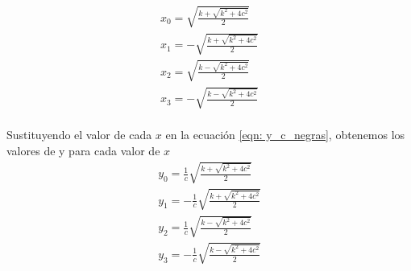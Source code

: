 \documentclass[12pt]{article}
\begin{document}
\begin{align*}
  x_0=\sqrt{\frac{k+\sqrt{k^2+4c^2}}{2}}\\
  x_1=-\sqrt{\frac{k+\sqrt{k^2+4c^2}}{2}}\\
  x_2=\sqrt{\frac{k-\sqrt{k^2+4c^2}}{2}}\\
  x_3=-\sqrt{\frac{k-\sqrt{k^2+4c^2}}{2}}\\
\end{align*}

Sustituyendo el valor de cada $x$ en la ecuación \eqref{eqn: y_c_negras}, obtenemos los valores de y para cada valor de $x$
\begin{align*}
  y_0=\frac{1}{c}\sqrt{\frac{k+\sqrt{k^2+4c^2}}{2}}\\
  y_1=-\frac{1}{c}\sqrt{\frac{k+\sqrt{k^2+4c^2}}{2}}\\
  y_2=\frac{1}{c}\sqrt{\frac{k-\sqrt{k^2+4c^2}}{2}}\\
  y_3=-\frac{1}{c}\sqrt{\frac{k-\sqrt{k^2+4c^2}}{2}}\\
\end{align*}
\end{document}
